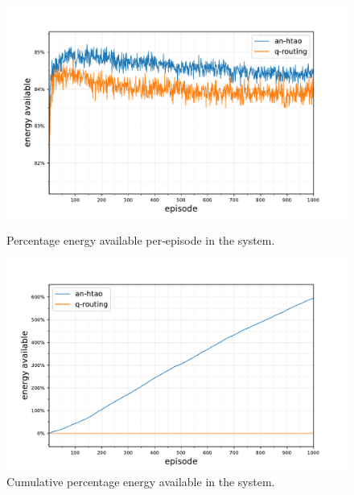 \begin{figure}[ht]
	\begin{minipage}{.49\textwidth}
		\centering
		\includegraphics[width=1.0\linewidth,trim={25pt 0pt 50pt 0pt},clip]{520balanced_statistics-energy-available}
		\captionsetup{labelfont=bf,singlelinecheck=on}
		\caption{Percentage energy available  per-episode \newline in the \simulationSimple{}{} system.}
		\label{fig:simple_energy}
	\end{minipage}
	\begin{minipage}{.49\textwidth}
		\centering
		\includegraphics[width=1.0\linewidth,trim={25pt 0pt 50pt 0pt},clip]{520comparison_statistics-energy-available-baseline-comparison-cumulative}
		\captionsetup{labelfont=bf,singlelinecheck=on}
		\caption{Cumulative percentage energy available \newline in the \simulationSimple{}{} system.}
		\label{fig:simple_cumulative_energy}
	\end{minipage}\hfill%
\end{figure}

